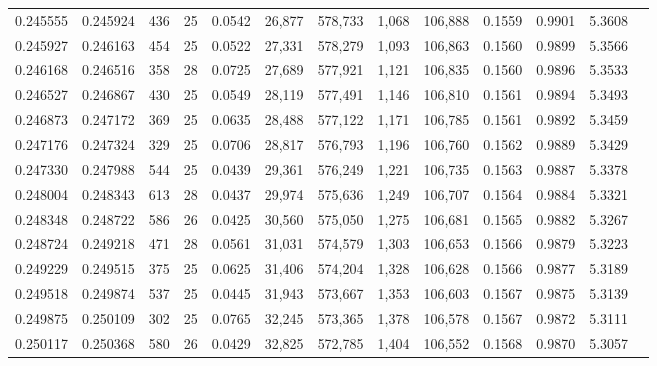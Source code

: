 \begin{tabular}{rrrrrrrrrrrrr}
0.245555 & 0.245924 &   436 &  25 &                                     0.0542 &  26,877 & 578,733 &   1,068 & 106,888 & 0.1559 & 0.9901 & 5.3608 \\
0.245927 & 0.246163 &   454 &  25 &                                     0.0522 &  27,331 & 578,279 &   1,093 & 106,863 & 0.1560 & 0.9899 & 5.3566 \\
0.246168 & 0.246516 &   358 &  28 &                                     0.0725 &  27,689 & 577,921 &   1,121 & 106,835 & 0.1560 & 0.9896 & 5.3533 \\
0.246527 & 0.246867 &   430 &  25 &                                     0.0549 &  28,119 & 577,491 &   1,146 & 106,810 & 0.1561 & 0.9894 & 5.3493 \\
0.246873 & 0.247172 &   369 &  25 &                                     0.0635 &  28,488 & 577,122 &   1,171 & 106,785 & 0.1561 & 0.9892 & 5.3459 \\
0.247176 & 0.247324 &   329 &  25 &                                     0.0706 &  28,817 & 576,793 &   1,196 & 106,760 & 0.1562 & 0.9889 & 5.3429 \\
0.247330 & 0.247988 &   544 &  25 &                                     0.0439 &  29,361 & 576,249 &   1,221 & 106,735 & 0.1563 & 0.9887 & 5.3378 \\
0.248004 & 0.248343 &   613 &  28 &                                     0.0437 &  29,974 & 575,636 &   1,249 & 106,707 & 0.1564 & 0.9884 & 5.3321 \\
0.248348 & 0.248722 &   586 &  26 &                                     0.0425 &  30,560 & 575,050 &   1,275 & 106,681 & 0.1565 & 0.9882 & 5.3267 \\
0.248724 & 0.249218 &   471 &  28 &                                     0.0561 &  31,031 & 574,579 &   1,303 & 106,653 & 0.1566 & 0.9879 & 5.3223 \\
0.249229 & 0.249515 &   375 &  25 &                                     0.0625 &  31,406 & 574,204 &   1,328 & 106,628 & 0.1566 & 0.9877 & 5.3189 \\
0.249518 & 0.249874 &   537 &  25 &                                     0.0445 &  31,943 & 573,667 &   1,353 & 106,603 & 0.1567 & 0.9875 & 5.3139 \\
0.249875 & 0.250109 &   302 &  25 &                                     0.0765 &  32,245 & 573,365 &   1,378 & 106,578 & 0.1567 & 0.9872 & 5.3111 \\
0.250117 & 0.250368 &   580 &  26 &                                     0.0429 &  32,825 & 572,785 &   1,404 & 106,552 & 0.1568 & 0.9870 & 5.3057 \\

\end{tabular}
